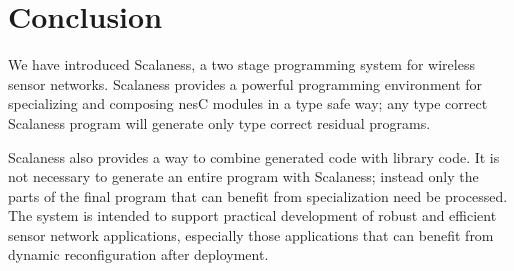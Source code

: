 \section{Conclusion}
\label{section-conclusion}

We have introduced Scalaness, a two stage programming system for
wireless sensor networks. Scalaness provides a powerful programming
environment for specializing and composing nesC modules in a type safe
way; any type correct Scalaness program will generate only type
correct residual programs.

Scalaness also provides a way to combine generated code with library
code. It is not necessary to generate an entire program with
Scalaness; instead only the parts of the final program that can
benefit from specialization need be processed. The system is intended
to support practical development of robust and efficient sensor
network applications, especially those applications that can benefit
from dynamic reconfiguration after deployment.
